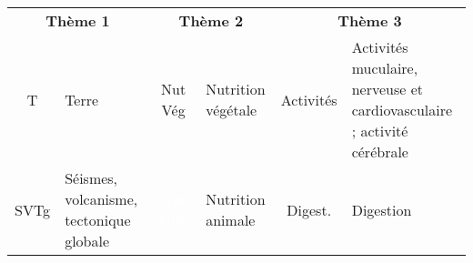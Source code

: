 \documentclass[8pt]{extarticle}
\begin{document}
\begin{tabularx}{\linewidth}{|cX|cX|cX|}
  \multicolumn{2}{c}{\textbf{Thème 1}} & \multicolumn{2}{c}{\textbf{Thème 2}} & \multicolumn{2}{c}{\textbf{Thème 3}} \\
  \cellcolor{terre}T & Terre & \cellcolor{nutveg}Nut Vég & Nutrition végétale & \cellcolor{activites}Activités & Activités muculaire, nerveuse et cardiovasculaire ; activité cérébrale \\
  \cellcolor{SVTG}SVTg & Séismes, volcanisme, tectonique globale & \cellcolor{nutani}\textcolor{white}{Nut Anim} & Nutrition animale & \cellcolor{digestion}Digest. & Digestion \\

\end{tabularx}
\end{document}
